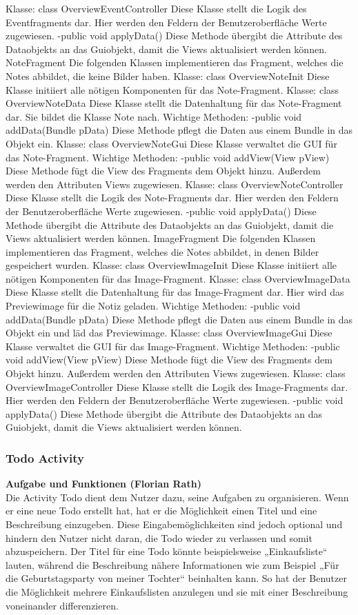 Klasse: class OverviewEventController
Diese Klasse stellt die Logik des Eventfragments dar. Hier werden den Feldern der Benutzeroberfläche Werte zugewiesen.
-public void applyData()
Diese Methode übergibt die Attribute des Dataobjekts an das Guiobjekt, damit die Views aktualisiert werden können.
NoteFragment
Die folgenden Klassen implementieren das Fragment, welches die Notes abbildet, die keine Bilder haben.
Klasse: class OverviewNoteInit
Diese Klasse initiiert alle nötigen Komponenten für das Note-Fragment.
Klasse: class OverviewNoteData
Diese Klasse stellt die Datenhaltung für das Note-Fragment dar. Sie bildet die Klasse Note nach.
Wichtige Methoden:
-public void addData(Bundle pData)
Diese Methode pflegt die Daten aus einem Bundle in das Objekt ein.
Klasse: class OverviewNoteGui
Diese Klasse verwaltet die GUI für das Note-Fragment.
Wichtige Methoden:
-public void addView(View pView)
Diese Methode fügt die View des Fragments dem Objekt hinzu. Außerdem werden den Attributen Views zugewiesen.
Klasse: class OverviewNoteController
Diese Klasse stellt die Logik des Note-Fragments dar. Hier werden den Feldern der Benutzeroberfläche Werte zugewiesen.
-public void applyData()
Diese Methode übergibt die Attribute des Dataobjekts an das Guiobjekt, damit die Views aktualisiert werden können.
ImageFragment
Die folgenden Klassen implementieren das Fragment, welches die Notes abbildet, in denen Bilder gespeichert wurden.
Klasse: class OverviewImageInit
Diese Klasse initiiert alle nötigen Komponenten für das Image-Fragment.
Klasse: class OverviewImageData
Diese Klasse stellt die Datenhaltung für das Image-Fragment dar. Hier wird das Previewimage für die Notiz geladen.
Wichtige Methoden:
-public void addData(Bundle pData)
Diese Methode pflegt die Daten aus einem Bundle in das Objekt ein und läd das Previewimage.
Klasse: class OverviewImageGui
Diese Klasse verwaltet die GUI für das Image-Fragment.
Wichtige Methoden:
-public void addView(View pView)
Diese Methode fügt die View des Fragments dem Objekt hinzu. Außerdem werden den Attributen Views zugewiesen.
Klasse: class OverviewImageController
Diese Klasse stellt die Logik des Image-Fragments dar. Hier werden den Feldern der Benutzeroberfläche Werte zugewiesen.
-public void applyData()
Diese Methode übergibt die Attribute des Dataobjekts an das Guiobjekt, damit die Views aktualisiert werden können.

\subsubsection{Todo Activity}
\textbf{Aufgabe und Funktionen (Florian Rath)}\\
Die Activity Todo dient dem Nutzer dazu, seine Aufgaben zu organisieren. Wenn er eine neue Todo erstellt hat, hat er die Möglichkeit einen Titel und eine Beschreibung einzugeben. Diese Eingabemöglichkeiten sind jedoch optional und hindern den Nutzer nicht daran, die Todo wieder zu verlassen und somit abzuspeichern. Der Titel für eine Todo könnte beispielsweise „Einkaufsliste“ lauten, während die Beschreibung nähere Informationen wie zum Beispiel „Für die Geburtstagsparty von meiner Tochter“ beinhalten kann. So hat der Benutzer die Möglichkeit mehrere Einkaufslisten anzulegen und sie mit einer Beschreibung voneinander differenzieren.

